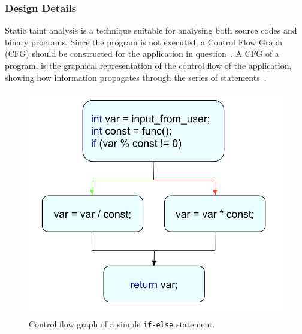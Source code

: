 \documentclass[LaM,binding=0.6cm]{sapthesis}
\begin{document}
\subsubsection{Design Details}
Static taint analysis is a technique suitable for analysing both source codes and binary programs. Since the program is not executed, a Control Flow Graph (CFG) should be constructed for the application in question~\cite{mumtaz2017critical}. A CFG of a program, is the graphical representation of the control flow of the application, showing how information propagates through the series of statements~\cite{WhyProgr19:online}.

\begin{figure}[h!]
\centering
\includegraphics[scale=.5]{images/techn1}
\caption{Control flow graph of a simple \texttt{if-else} statement.}
\end{figure}
\end{document}
